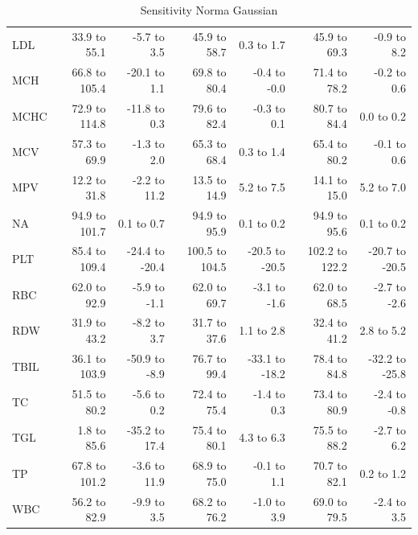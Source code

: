 \begin{table}[ht]
\begin{tabular}{lrrrrrr}
LDL & 33.9 to 55.1 & -5.7 to 3.5 & 45.9 to 58.7 & 0.3 to 1.7 & 45.9 to 69.3 & -0.9 to 8.2 \\
MCH & 66.8 to 105.4 & -20.1 to 1.1 & 69.8 to 80.4 & -0.4 to -0.0 & 71.4 to 78.2 & -0.2 to 0.6 \\
MCHC & 72.9 to 114.8 & -11.8 to 0.3 & 79.6 to 82.4 & -0.3 to 0.1 & 80.7 to 84.4 & 0.0 to 0.2 \\
MCV & 57.3 to 69.9 & -1.3 to 2.0 & 65.3 to 68.4 & 0.3 to 1.4 & 65.4 to 80.2 & -0.1 to 0.6 \\
MPV & 12.2 to 31.8 & -2.2 to 11.2 & 13.5 to 14.9 & 5.2 to 7.5 & 14.1 to 15.0 & 5.2 to 7.0 \\
NA & 94.9 to 101.7 & 0.1 to 0.7 & 94.9 to 95.9 & 0.1 to 0.2 & 94.9 to 95.6 & 0.1 to 0.2 \\
PLT & 85.4 to 109.4 & -24.4 to -20.4 & 100.5 to 104.5 & -20.5 to -20.5 & 102.2 to 122.2 & -20.7 to -20.5 \\
RBC & 62.0 to 92.9 & -5.9 to -1.1 & 62.0 to 69.7 & -3.1 to -1.6 & 62.0 to 68.5 & -2.7 to -2.6 \\
RDW & 31.9 to 43.2 & -8.2 to 3.7 & 31.7 to 37.6 & 1.1 to 2.8 & 32.4 to 41.2 & 2.8 to 5.2 \\
TBIL & 36.1 to 103.9 & -50.9 to -8.9 & 76.7 to 99.4 & -33.1 to -18.2 & 78.4 to 84.8 & -32.2 to -25.8 \\
TC & 51.5 to 80.2 & -5.6 to 0.2 & 72.4 to 75.4 & -1.4 to 0.3 & 73.4 to 80.9 & -2.4 to -0.8 \\
TGL & 1.8 to 85.6 & -35.2 to 17.4 & 75.4 to 80.1 & 4.3 to 6.3 & 75.5 to 88.2 & -2.7 to 6.2 \\
TP & 67.8 to 101.2 & -3.6 to 11.9 & 68.9 to 75.0 & -0.1 to 1.1 & 70.7 to 82.1 & 0.2 to 1.2 \\
WBC & 56.2 to 82.9 & -9.9 to 3.5 & 68.2 to 76.2 & -1.0 to 3.9 & 69.0 to 79.5 & -2.4 to 3.5 \\
\bottomrule
\end{tabular}
\caption{Sensitivity Norma Gaussian}
\label{tab:sensitivity_norma_gaussian}
\end{table}
